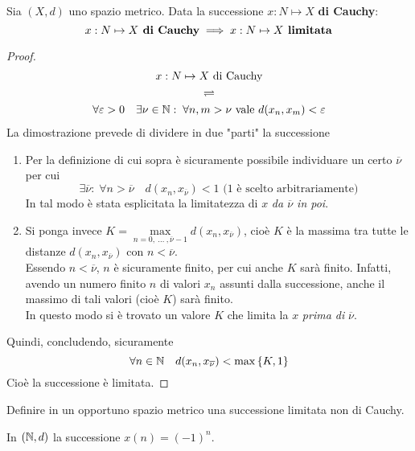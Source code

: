 \begin{proposition}
	\label{prop:se_cau_allora_lim}
	Sia $(X,d)$ uno spazio metrico. Data la successione $x: N \mapsto X$ \textbf{di Cauchy}:
	\[x: N \mapsto X \text{\textbf{ di Cauchy}} \implies x: N \mapsto X \text{\textbf{ limitata}}\]
	\begin{proof}
		\begin{equation*}
			\begin{gathered}
				x: N \mapsto X \text{ di Cauchy}\\
				\rightleftharpoons\\
				\forall \varepsilon > 0\quad \exists \nu \in \mathbb{N}:\; \forall n,m > \nu \text{ vale } d(x_n, x_m) < \varepsilon
			\end{gathered}
		\end{equation*}
		La dimostrazione prevede di dividere in due "parti" la successione
		\begin{enumerate}
			\item Per la definizione di cui sopra è sicuramente possibile individuare un certo $\overline{\nu}$ per cui
				\[\exists \overline{\nu}:\; \forall n > \overline{\nu} \quad d(x_n, x_{\overline{\nu}}) < 1 \text{ (1 è scelto arbitrariamente)}\]
				In tal modo è stata esplicitata la limitatezza di $x$ \textit{da $\overline{\nu}$ in poi}.
			\item Si ponga invece $K = \max\limits_{n=0,\: \dotsc \:, \overline{\nu}-1} d(x_n, x_{\overline{\nu}})$, cioè $K$ è la massima tra tutte le distanze $d(x_n, x_{\overline{\nu}})$ con $n < \overline{\nu}$.\\
				Essendo $n < \overline{\nu}$, $n$ è sicuramente finito, per cui anche $K$ sarà finito. Infatti, avendo un numero finito $n$ di valori $x_n$ assunti dalla successione, anche il massimo di tali valori (cioè $K$) sarà finito.\\
				In questo modo si è trovato un valore $K$ che limita la $x$ \textit{prima di} $\overline{\nu}$.
		\end{enumerate}
		Quindi, concludendo, sicuramente
		\[\forall n \in \mathbb{N} \quad d(x_n, x_{\overline{\nu}}) < \max \left\{K, 1\right\}\]
		Cioè la successione è limitata.
	\end{proof}
\end{proposition}
\begin{exercise}
	\label{ex:succ_lim_non_cau}
	Definire in un opportuno spazio metrico una successione limitata non di Cauchy.
	\begin{solution}
		In $(\mathbb{N},d)$ la successione $x(n) = (-1)^n$.
	\end{solution}
\end{exercise}
